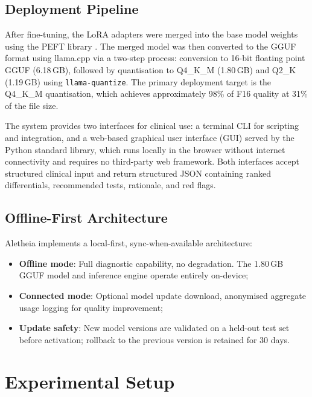 \documentclass[journal]{IEEEtran}
\begin{document}
\subsection{Deployment Pipeline}

After fine-tuning, the LoRA adapters were merged into the base
model weights using the PEFT library \cite{peft2023}. The merged
model was then converted to the GGUF format using llama.cpp
\cite{gerganov2023llamacpp} via a two-step process: conversion to
16-bit floating point GGUF (6.18\,GB), followed by quantisation
to Q4\_K\_M (1.80\,GB) and Q2\_K (1.19\,GB) using
\texttt{llama-quantize}. The primary deployment target is the
Q4\_K\_M quantisation, which achieves approximately 98\% of F16
quality at 31\% of the file size.

The system provides two interfaces for clinical use: a terminal CLI for scripting and integration, and a web-based graphical user interface (GUI) \cite{aletheia_github} served by the Python standard library, which runs locally in the browser without internet connectivity and requires no third-party web framework. Both interfaces accept structured clinical input and return structured JSON containing ranked differentials, recommended tests, rationale, and red flags.

\subsection{Offline-First Architecture}

Aletheia implements a local-first, sync-when-available architecture:
\begin{itemize}
  \item \textbf{Offline mode}: Full diagnostic capability, no
        degradation. The 1.80\,GB GGUF model and inference engine
        operate entirely on-device;
  \item \textbf{Connected mode}: Optional model update download,
        anonymised aggregate usage logging for quality improvement;
  \item \textbf{Update safety}: New model versions are validated on
        a held-out test set before activation; rollback to the
        previous version is retained for 30 days.
\end{itemize}

\section{Experimental Setup}
\label{sec:experiments}
\end{document}
